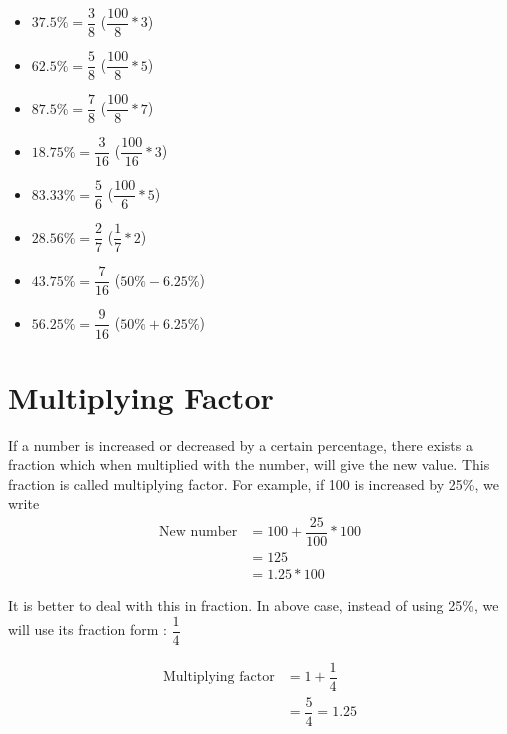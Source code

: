 \begin{multicols}{3}
\begin{itemize}
    \item $37.5\% = \dfrac{3}{8}$ \hspace{0.2cm}($\dfrac{100}{8} * 3$)
    \item $62.5\% = \dfrac{5}{8}$ \hspace{0.2cm}($\dfrac{100}{8} * 5$)
    \item $87.5\% = \dfrac{7}{8}$ \hspace{0.2cm}($\dfrac{100}{8} * 7$)
    \item $18.75\% = \dfrac{3}{16}$ \hspace{0.2cm}($\dfrac{100}{16} * 3$)
    \item $83.33\% = \dfrac{5}{6}$ \hspace{0.2cm}($\dfrac{100}{6} * 5$)
    \item $28.56\% = \dfrac{2}{7}$ \hspace{0.2cm}($\dfrac{1}{7} * 2$)
    \item $43.75\% = \dfrac{7}{16}$ \hspace{0.2cm}($50\% - 6.25\%$)
    \item $56.25\% = \dfrac{9}{16}$ ($50\% + 6.25\%$)
\end{itemize}

\end{multicols}
\newpage












\section{Multiplying Factor}
If a number is increased or decreased by a certain percentage, there exists a fraction which when multiplied with the number, will give the new value. This fraction is called multiplying factor. For example, if 100 is increased by 25\%, we write
\begin{align*}
    \text{New number} &= 100 + \dfrac{25}{100} * 100 \\
    &= 125 \\
    &= 1.25 * 100 \tag{1.25 is the multiplication factor}
\end{align*}

It is better to deal with this in fraction. In above case, instead of using 25\%, we will use its fraction form : $\dfrac{1}{4}$

\begin{align*}
    \text{Multiplying factor} &= 1 + \dfrac{1}{4} \\
    &= \dfrac{5}{4} = 1.25
\end{align*}


